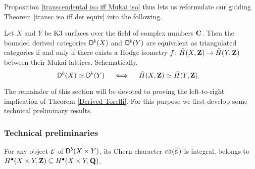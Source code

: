 \noindent
Proposition \ref{transcendental iso iff Mukai iso} thus lets us reformulate our guiding Theorem \ref{transc iso iff der equiv} into the following.

\begin{theorem}
    \label{Derived Torelli}
    Let $X$ and $Y$ be K3 surfaces over the field of complex numbers $\mathbf C$. Then the bounded derived categories $\mathsf{D}^b(X)$ and $\mathsf{D}^b(Y)$ are equivalent as triangulated categories if and only if there exists a Hodge isometry $f \colon \,\tilde{\!{H}}(X, \mathbf Z) \to \,\tilde{\!{H}}(Y, \mathbf Z)$ between their Mukai lattices. Schematically,
    \[
        \mathsf{D}^b(X) \simeq \mathsf{D}^b(Y) \quad \iff \quad \,\tilde{\!{H}}(X, \mathbf Z) \simeq \,\tilde{\!{H}}(Y, \mathbf Z).
    \] 
\end{theorem}

The remainder of this section will be devoted to proving the left-to-right implication of Theorem \ref{Derived Torelli}. For this purpose we first develop some technical preliminary results.

\subsubsection*{Technical preliminaries}

\begin{lemma}
    \label{Mukai vector is integral}
    For any object $\mathcal E$ of $\mathsf{D}^b(X \times Y)$, its Chern character $\ch{\E}$ is integral, \ie belongs to $H^\bullet(X \times Y, \mathbf Z) \subseteq H^\bullet(X \times Y, \mathbf Q)$. 
\end{lemma}

